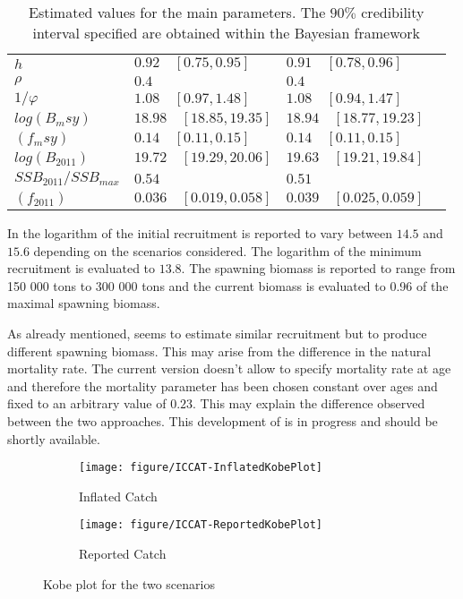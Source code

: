 \begin{table}
\begin{tabular}{p{2.1cm}p{4cm}p{4cm}p{4cm}}
$h$  & $0.92\quad [0.75, 0.95]$ & $0.91\quad[0.78, 0.96]$\\ 
$\rho$ &    $0.4$ & $0.4$	\\ 
$1/\varphi$  & $1.08\quad [0.97 ,1.48]$ & $1.08\quad[0.94, 1.47]$\\
$log(B_msy)$ &  $18.98\quad [18.85, 19.35]$ & $18.94\quad[18.77,19.23] $\\
$(f_msy)$   & $0.14\quad [0.11, 0.15]$ & $0.14\quad[0.11, 0.15]$\\
$log(B_{2011})$   & $19.72\quad[19.29, 20.06]$ & $19.63\quad[19.21, 19.84]$\\
$SSB_{2011}/SSB_{max}$   &  $0.54$   & $0.51$ \\
$(f_{2011})$ & $0.036\quad[0.019, 0.058]$  &   $0.039\quad[0.025, 0.059]$ \\ \hline\hline
\end{tabular}
\caption{Estimated values for the main parameters. The $90\%$ credibility interval specified are obtained within the Bayesian framework}
\label{table:mleRinit}
\end{table}

In \cite{tuna2012} the logarithm of the initial recruitment is reported to vary between $14.5$ and $15.6$ depending on the scenarios considered.
The logarithm of the minimum recruitment is evaluated to $13.8$. The spawning biomass is reported to range from 150 000 tons to 300 000 tons and the 
current biomass is evaluated to 0.96 of the maximal spawning biomass.

As already mentioned, \iscam seems to estimate similar recruitment but to produce different spawning biomass. This may arise from the difference in the natural mortality rate.
The current \iscam version doesn't allow to specify mortality rate at age and therefore the mortality parameter has been chosen constant over ages and fixed to an arbitrary value of $0.23$. 
This may explain the difference observed between the two approaches. This development of \iscam is in progress and should be shortly available.





\begin{figure}
 \begin{subfigure}[b]{\textwidth}
  \texttt{[image: figure/ICCAT-InflatedKobePlot]} 
  \caption{Inflated Catch}
  \end{subfigure}
 \begin{subfigure}[b]{\textwidth}
  \texttt{[image: figure/ICCAT-ReportedKobePlot]} 
	\caption{Reported Catch}
  \end{subfigure}
\caption{Kobe plot for the two scenarios}
\end{figure}

